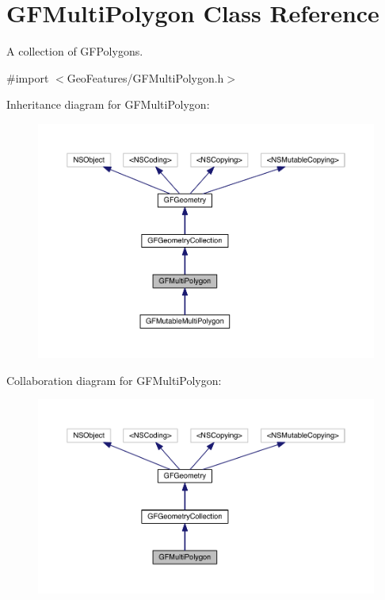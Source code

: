 \hypertarget{interface_g_f_multi_polygon}{}\section{G\+F\+Multi\+Polygon Class Reference}
\label{interface_g_f_multi_polygon}


A collection of G\+F\+Polygons.  




{\ttfamily \#import $<$Geo\+Features/\+G\+F\+Multi\+Polygon.\+h$>$}



Inheritance diagram for G\+F\+Multi\+Polygon\+:\nopagebreak
\begin{figure}[H]
\begin{center}
\leavevmode
\includegraphics[width=350pt]{interface_g_f_multi_polygon__inherit__graph}
\end{center}
\end{figure}


Collaboration diagram for G\+F\+Multi\+Polygon\+:\nopagebreak
\begin{figure}[H]
\begin{center}
\leavevmode
\includegraphics[width=350pt]{interface_g_f_multi_polygon__coll__graph}
\end{center}
\end{figure}
